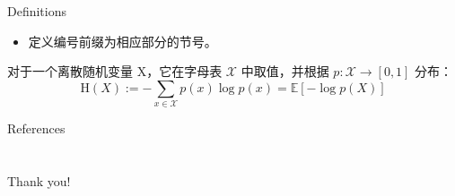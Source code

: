 \documentclass[
    11pt,
    notheorems,
    hyperref={pdfauthor=whatever}
]{beamer}
\begin{document}
\begin{frame}{}{Definitions}
    \begin{itemize}
        \item 定义编号前缀为相应部分的节号。
    \end{itemize}
    \begin{definition}[示例定义]
        对于一个离散随机变量 X，它在字母表 \(\mathcal{X}\) 中取值，并根据 \(p:{\mathcal {X}}\to [0,1]\) 分布：
        \begin{equation}
            \mathrm {H} (X):=-\sum _{x\in {\mathcal {X}}}p(x)\log p(x)=\mathbb {E} [-\log p(X)]
        \end{equation}
    \end{definition}
\end{frame}

\begin{frame}[allowframebreaks]{References}
    \printbibliography
\end{frame}

\section{}
\begin{frame}
\Huge{\centerline{Thank you!}}
\end{frame}
\end{document}
